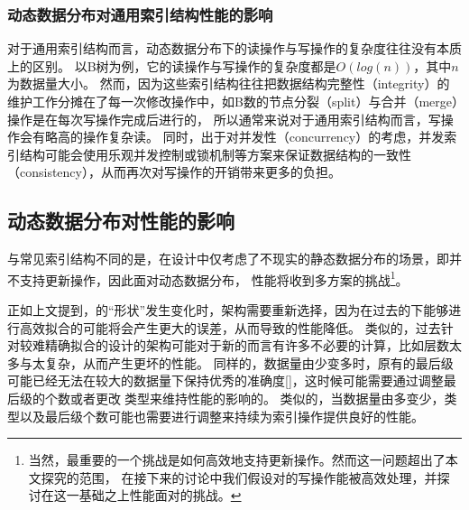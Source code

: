 

\subsubsection{动态数据分布对通用索引结构性能的影响}

对于通用索引结构而言，动态数据分布下的读操作与写操作的复杂度往往没有本质上的区别。
以B树为例，它的读操作与写操作的复杂度都是$O(log(n))$，其中$n$为数据量大小。
然而，因为这些索引结构往往把数据结构完整性（integrity）的维护工作分摊在了每一次修改操作中，如B数的节点分裂（split）与合并（merge）操作是在每次写操作完成后进行的，
所以通常来说对于通用索引结构而言，写操作会有略高的操作复杂读。
同时，出于对并发性（concurrency）的考虑，并发索引结构可能会使用乐观并发控制或锁机制等方案来保证数据结构的一致性（consistency），从而再次对写操作的开销带来更多的负担。

\subsection{动态数据分布对{\li}性能的影响}
\label{sec:dist-affect-li}

与常见索引结构不同的是，{\li}在设计中仅考虑了不现实的静态数据分布的场景，即{\li}并不支持更新操作，因此面对动态数据分布，
{\li}性能将收到多方案的挑战\footnote{当然，最重要的一个挑战是如何高效地支持更新操作。然而这一问题超出了本文探究的范围，
在接下来的讨论中我们假设对{\li}的写操作能被高效处理，并探讨在这一基础之上{\li}性能面对的挑战。}。

正如上文提到，{\cdf}的``形状''发生变化时，{\rmi}架构需要重新选择，因为在过去的{\cdf}下能够进行高效拟合的{\model}可能将会产生更大的误差，从而导致{\li}的性能降低。
类似的，过去针对较难精确拟合的{\cdf}设计的{\rmi}架构可能对于新的{\cdf}而言有许多不必要的计算，比如{\rmi}层数太多与{\model}太复杂，从而产生更坏的{\li}性能。
同样的，数据量由少变多时，原有的{\rmi}最后级{\model}可能已经无法在较大的数据量下保持优秀的准确度[]，这时候可能需要通过调整{\rmi}最后级{\model}的个数或者更改{\model}类型来维持{\li}性能的影响的。
类似的，当数据量由多变少，{\model}类型以及{\rmi}最后级{\model}个数可能也需要进行调整来持续为索引操作提供良好的性能。

